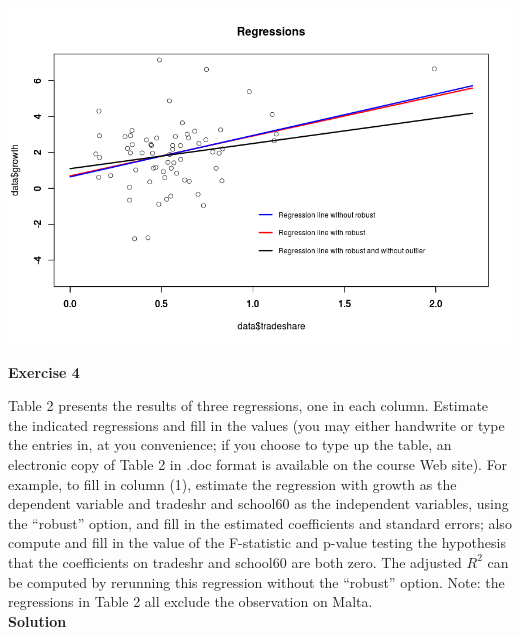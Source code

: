\documentclass[12pt]{article}
\begin{document}
\includegraphics[width=1\textwidth]{Rplot1.png}

\textbf{Exercise 4}
\bigskip

Table 2 presents the results of three regressions, one in each column. Estimate the indicated regressions and fill in the values (you may either handwrite or type the entries in, at you convenience; if you choose to type up the table, an electronic copy of Table 2 in .doc format is available on the course Web site). For example, to fill in column (1), estimate the regression with growth as the dependent variable and tradeshr and school60 as the independent variables, using the “robust” option, and fill in the estimated coefficients and standard errors; also compute and fill in the value of the F-statistic and p-value testing the hypothesis that the coefficients on tradeshr and school60 are both zero. The adjusted $R^2$ can be computed by rerunning this regression without the “robust” option. Note: the regressions in Table 2 all exclude the observation on Malta.\\

\textbf{Solution}
\medskip
\end{document}
